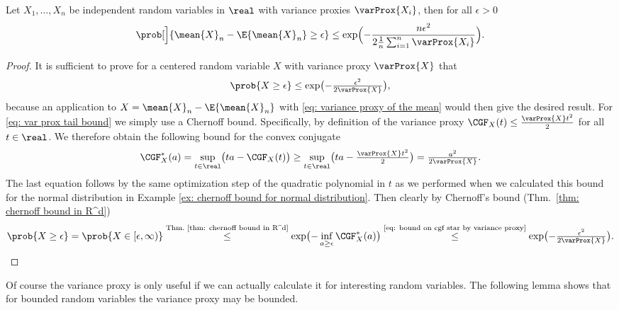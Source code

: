 \begin{mdframed}[innertopmargin=0pt]
\begin{theorem}
    \label{thm: general hoeffding inequality}
    Let \(X_1, \ldots, X_n\) be independent random variables in \(\real\) with
    variance proxies \(\varProx{X_i}\), then for all \(\epsilon > 0\)
    \[
        \prob[\Big]{\mean{X}_n - \E{\mean{X}_n} \ge \epsilon}
        \le \exp\Bigl(-\frac{n \epsilon^2}{2\frac1n\sum_{i=1}^n \varProx{X_i}}\Bigr).
    \]
\end{theorem}
\end{mdframed}
\begin{proof}
    It is sufficient to prove for a centered random variable \(X\) with variance
    proxy \(\varProx{X}\) that
    \begin{equation}
        \label{eq: var prox tail bound}    
        \prob{X \ge \epsilon} \le \exp\bigl(-\tfrac{\epsilon^2}{2\varProx{X}}\bigr),
    \end{equation}
    because an application to \(X = \mean{X}_n - \E{\mean{X}_n}\) with
    \eqref{eq: variance proxy of the mean} would then give the desired result.
    For \eqref{eq: var prox tail bound} we simply use a Chernoff bound. 
    Specifically, by definition of the variance proxy \(\CGF_X(t) \le \frac{\varProx{X} t^2}2\) for all \(t\in \real\).
    We therefore obtain the following bound for the convex conjugate
    \begin{equation}
        \label{eq: bound on cgf star by variance proxy}    
        \CGF_X^*(a)
        = \sup_{t\in \real} \bigl(t a - \CGF_X(t)\bigr)
        \ge \sup_{t\in \real} \bigl(t a - \tfrac{\varProx{X} t^2}2\bigr)
        = \tfrac{a^2}{2\varProx{X}}.
    \end{equation}
    The last equation follows by the same optimization step of the quadratic
    polynomial in \(t\) as we performed when we calculated this bound for the
    normal distribution in Example \ref{ex: chernoff bound for normal
    distribution}. Then clearly by Chernoff's bound (Thm.~\ref{thm: chernoff bound in R^d})
    \[
        \prob{X\ge \epsilon} = \prob{X \in [\epsilon , \infty)}
        \overset{\text{Thm.~\ref{thm: chernoff bound in R^d}}}\le \exp\bigl(-\inf_{a \ge \epsilon}\CGF_X^*(a)\bigr)
        \overset{\text{\eqref{eq: bound on cgf star by variance proxy}}}\le \exp\bigl(-\tfrac{\epsilon^2}{2\varProx{X}}\bigr).
        \qedhere
    \]
\end{proof}

Of course the variance proxy is only useful if we can actually calculate it for
interesting random variables. The following lemma shows that for bounded random
variables the variance proxy may be bounded.

